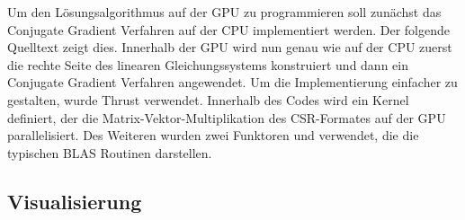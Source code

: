 \documentclass[crop=false,10pt,ngerman]{standalone}
\begin{document}
      Um den Lösungsalgorithmus auf der GPU zu programmieren soll zunächst das Conjugate Gradient Verfahren auf der CPU implementiert werden.
      Der folgende Quelltext zeigt dies.
      Innerhalb der GPU wird nun genau wie auf der CPU zuerst die rechte Seite des linearen Gleichungssystems konstruiert und dann ein Conjugate Gradient Verfahren angewendet.
      Um die Implementierung einfacher zu gestalten, wurde Thrust verwendet.
      Innerhalb des Codes wird ein Kernel definiert, der die Matrix-Vektor-Multiplikation des CSR-Formates auf der GPU parallelisiert.
      Des Weiteren wurden zwei Funktoren  und  verwendet, die die typischen BLAS Routinen darstellen.

    \subsection{Visualisierung} %
    \label{sub:visualisierung}
\end{document}
